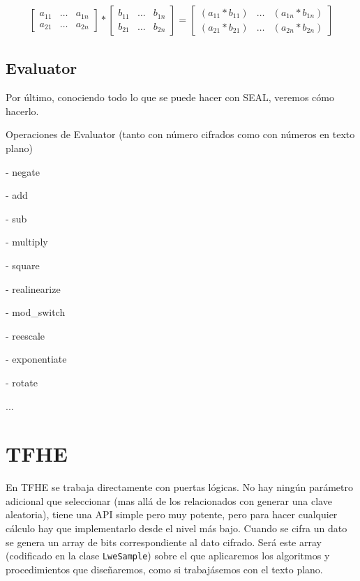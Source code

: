 \begin{gather}
    \begin{bmatrix}
        a_{11}  & \hdots    & a_{1n} \\
        a_{21}  & \hdots    & a_{2n}
    \end{bmatrix}
    *
    \begin{bmatrix}
        b_{11}  & \hdots    & b_{1n} \\
        b_{21}  & \hdots    & b_{2n}
    \end{bmatrix} 
    =
    \begin{bmatrix}
        (a_{11} * b_{11})    & \hdots    & (a_{1n} * b_{1n}) \\
        (a_{21} * b_{21})    & \hdots    & (a_{2n} * b_{2n})
    \end{bmatrix}
\end{gather}



\subsection{Evaluator}

Por último, conociendo todo lo que se puede hacer con SEAL, veremos cómo hacerlo.

Operaciones de Evaluator (tanto con número cifrados como con números en texto plano)

- negate

- add

- sub

- multiply

- square

- realinearize

- mod\_switch

- reescale

- exponentiate

- rotate

...


\section{TFHE}

En TFHE se trabaja directamente con puertas lógicas. No hay ningún parámetro adicional que seleccionar (mas allá de los relacionados con generar una clave aleatoria), tiene una API simple pero muy potente, pero para hacer cualquier cálculo hay que implementarlo desde el nivel más bajo. Cuando se cifra un dato se genera un array de bits correspondiente al dato cifrado. Será este array (codificado en la clase \verb|LweSample|) sobre el que aplicaremos los algoritmos y procedimientos que diseñaremos, como si trabajásemos con el texto plano.

